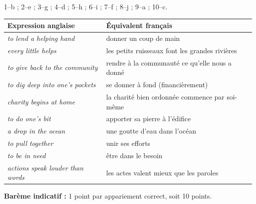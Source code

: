 \documentclass[11pt]{article}
\newcommand{\cle}[1]{{\popxbold\color{popdark}#1}}
\newcommand{\eng}[1]{\ifmmode\text{\textit{#1}}\else\begingroup\selectlanguage{english}\itshape #1\endgroup\fi}
\begin{document}
\begin{corrige}
1--b ; 2--e ; 3--g ; 4--d ; 5--h ; 6--i ; 7--f ; 8--j ; 9--a ; 10--c.

\begin{center}
\begin{tabularx}{\linewidth}{|X|X|}
\hline
\rowcolor{popblueL} Expression anglaise & Équivalent français \\
\hline
\eng{to \cle{lend a helping hand}} & donner un coup de main \\
\hline
\eng{\cle{every little helps}} & les petits ruisseaux font les grandes rivières \\
\hline
\eng{to \cle{give back to the community}} & rendre à la communauté ce qu'elle nous a donné \\
\hline
\eng{to \cle{dig deep into one's pockets}} & se donner à fond (financièrement) \\
\hline
\eng{\cle{charity begins at home}} & la charité bien ordonnée commence par soi-même \\
\hline
\eng{to \cle{do one's bit}} & apporter sa pierre à l'édifice \\
\hline
\eng{a \cle{drop in the ocean}} & une goutte d'eau dans l'océan \\
\hline
\eng{to \cle{pull together}} & unir ses efforts \\
\hline
\eng{to \cle{be in need}} & être dans le besoin \\
\hline
\eng{\cle{actions speak louder than words}} & les actes valent mieux que les paroles \\
\hline
\end{tabularx}
\end{center}
\textbf{Barème indicatif :} 1 point par appariement correct, soit 10 points.
\end{corrige}
\end{document}
